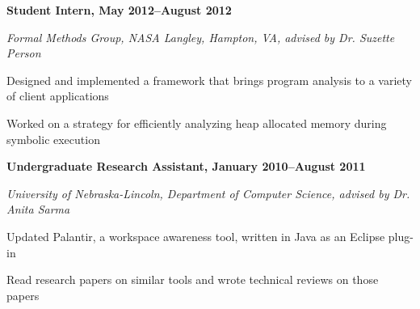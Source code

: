 \documentclass[10pt,letterpaper]{article}
\renewenvironment{itemize}{
  \begin{list}{}{
    \setlength{\leftmargin}{1.5em}
    \setlength{\itemsep}{0.25em}
    \setlength{\parskip}{0pt}
    \setlength{\parsep}{0.25em}
  }
}{
  \end{list}
}
\begin{document}
\begin{itemize}
\item \textbf{Student Intern, May 2012--August 2012}
\item \emph{Formal Methods Group, NASA Langley, Hampton, VA, advised by Dr. Suzette Person}
    \begin{itemize}
    \item Designed and implemented a framework that brings program analysis to a variety of client applications
    \item Worked on a strategy for efficiently analyzing heap allocated
        memory during symbolic execution
    \end{itemize}
\end{itemize}

\begin{comment}
\begin{itemize}
\item \textbf{Teaching Assistant for CSE361 (Software Engineering), August 2011--December 2011}
\item \emph{University of Nebraska-Lincoln, Department of Computer Science}
	\begin{itemize}
    \item Developed a semester project, assisted in class, graded assignments
	\end{itemize}
\end{itemize}
\end{comment}

\begin{itemize}
\item \textbf{Undergraduate Research Assistant, January 2010--August 2011}
\item \emph{University of Nebraska-Lincoln, Department of Computer Science, advised by Dr. Anita Sarma}
	\begin{itemize}
	\item Updated Palantir, a workspace awareness tool, written in Java as an Eclipse plug-in
	\item Read research papers on similar tools and wrote technical reviews on those papers
	\end{itemize}
\end{itemize}

\end{document}
